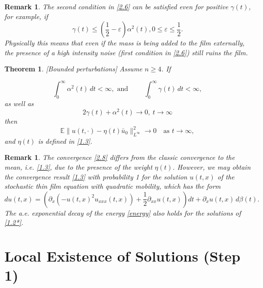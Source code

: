 \documentclass[a4paper,12pt]{article}
\newtheorem{theorem}[definition]{Theorem}
\newtheorem{remark}[definition]{Remark}
\numberwithin{equation}{section}
\newcommand{\ve}{{\varepsilon}}
\def\ve{\varepsilon}
\begin{document}
\begin{remark}
    The second condition in \eqref{2.6} can be satisfied even for positive $\gamma(t)$, for example, if 
    \[
\gamma(t) \leq (\frac12 - \ve)   \alpha^2(t), 0 \leq \ve \leq \frac12. 
\]
Physically this means that even if the mass is being added to the film externally, the  presence of a high intensity noise (first condition in \eqref{2.6}) still ruins the film. 
\end{remark}


\begin{theorem}\label{Th:2.5}[Bounded perturbations]
Assume $n \ge 4$. If 

\begin{equation}
\int_0^\infty \alpha^2(t) \, dt < \infty, \text { and }
\qquad
\int_0^\infty \gamma(t) \, dt < \infty,
\label{2.7}
\end{equation}
as well as 
\begin{equation}\label{2.7ast}
2 \gamma(t) + \alpha^2(t) \to 0, \ t \to \infty
\end{equation}
then
\begin{equation}
\mathbb{E}\|u(t,\cdot) - \eta(t) \bar{u}_0\|_{L^\infty}^2
\to 0
\quad \text{as } t \to \infty,
\label{2.8}
\end{equation}
and $\eta(t)$ is defined in \eqref{1.3}.

\end{theorem}


\begin{remark}\label{rem:1}
    The convergence \eqref{2.8} differs from the classic convergence to the mean, i.e. \eqref{1.3}, due to the presence of the weight $\eta(t)$. However, we may obtain the convergence result  \eqref{1.3} with probability 1 for the solution $u(t,x)$ of the stochastic thin film  equation with quadratic mobility, which has the form
\begin{equation}\label{1.2*}
du(t,x) = \left(\partial_x(-u(t,x)^{2}u_{xxx}(t,x)) + \frac{1}{2}  \partial_{xx}  u(t,x) \right)dt +
\partial_x u(t,x) \, d \beta(t).
\end{equation}
The a.e. exponential decay of the energy \eqref{energy} also holds for the solutions of \eqref{1.2*}.
\end{remark}






\section{Local Existence of Solutions (Step 1) } \label{Sec 3}
\end{document}
